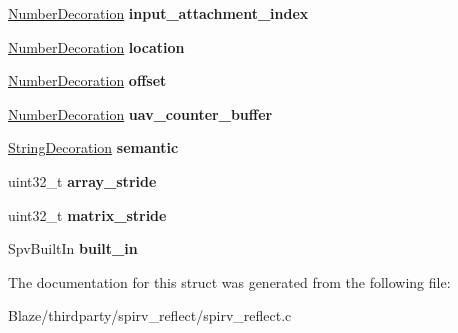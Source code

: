 \begin{DoxyCompactItemize}
\hyperlink{structNumberDecoration}{Number\+Decoration} {\bfseries input\+\_\+attachment\+\_\+index}
\item 
\mbox{\label{structDecorations_a5735a67d03648ab950c8637496bc205b}} 
\hyperlink{structNumberDecoration}{Number\+Decoration} {\bfseries location}
\item 
\mbox{\label{structDecorations_a886386f1fcfdd8d9ca819f08eaea9dca}} 
\hyperlink{structNumberDecoration}{Number\+Decoration} {\bfseries offset}
\item 
\mbox{\label{structDecorations_a3d67df4231093a8239809675ae76767d}} 
\hyperlink{structNumberDecoration}{Number\+Decoration} {\bfseries uav\+\_\+counter\+\_\+buffer}
\item 
\mbox{\label{structDecorations_a78981131f34c765c629cb921082a885a}} 
\hyperlink{structStringDecoration}{String\+Decoration} {\bfseries semantic}
\item 
\mbox{\label{structDecorations_a4f655b4c74f361f993c234eccfbf0431}} 
uint32\+\_\+t {\bfseries array\+\_\+stride}
\item 
\mbox{\label{structDecorations_a5d15c8ef6fa8ef51eadb6cbc57b40aa4}} 
uint32\+\_\+t {\bfseries matrix\+\_\+stride}
\item 
\mbox{\label{structDecorations_a54cbaa06d601801469c1330dda148cfb}} 
Spv\+Built\+In {\bfseries built\+\_\+in}
\end{DoxyCompactItemize}


The documentation for this struct was generated from the following file\+:\begin{DoxyCompactItemize}
\item 
Blaze/thirdparty/spirv\+\_\+reflect/spirv\+\_\+reflect.\+c\end{DoxyCompactItemize}

